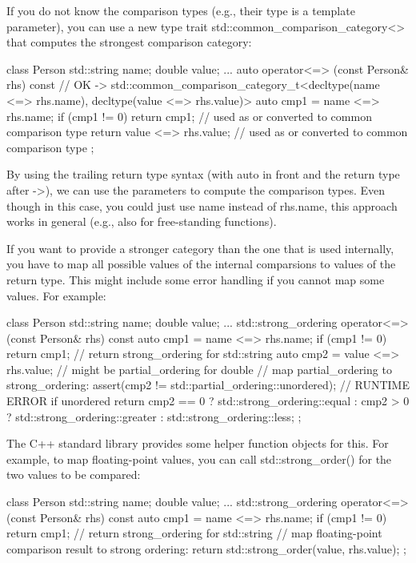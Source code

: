 If you do not know the comparison types (e.g., their type is a template parameter), you can use a new type trait std::common\_comparison\_category<> that computes the strongest comparison category:

\begin{cpp}
class Person {
	std::string name;
	double value;
	...
	auto operator<=> (const Person& rhs) const // OK
	-> std::common_comparison_category_t<decltype(name <=> rhs.name),
										 decltype(value <=> rhs.value)> {
		auto cmp1 = name <=> rhs.name;
		if (cmp1 != 0) return cmp1; // used as or converted to common comparison type
		return value <=> rhs.value; // used as or converted to common comparison type
	}
};
\end{cpp}

By using the trailing return type syntax (with auto in front and the return type after ->), we can use the parameters to compute the comparison types. Even though in this case, you could just use name instead of rhs.name, this approach works in general (e.g., also for free-standing functions).

If you want to provide a stronger category than the one that is used internally, you have to map all possible values of the internal comparsions to values of the return type. This might include some error handling if you cannot map some values. For example:

\begin{cpp}
class Person {
	std::string name;
	double value;
	...
	std::strong_ordering operator<=> (const Person& rhs) const {
		auto cmp1 = name <=> rhs.name;
		if (cmp1 != 0) return cmp1; // return strong_ordering for std::string
		auto cmp2 = value <=> rhs.value; // might be partial_ordering for double
		// map partial_ordering to strong_ordering:
		assert(cmp2 != std::partial_ordering::unordered); // RUNTIME ERROR if unordered
		return cmp2 == 0 ? std::strong_ordering::equal
		                 : cmp2 > 0 ? std::strong_ordering::greater
		                            : std::strong_ordering::less;
	}
};
\end{cpp}

The C++ standard library provides some helper function objects for this. For example, to map floating-point values, you can call std::strong\_order() for the two values to be compared:

\begin{cpp}
class Person {
	std::string name;
	double value;
	...
	std::strong_ordering operator<=> (const Person& rhs) const {
		auto cmp1 = name <=> rhs.name;
		if (cmp1 != 0) return cmp1; // return strong_ordering for std::string
		// map floating-point comparison result to strong ordering:
		return std::strong_order(value, rhs.value);
	}
};
\end{cpp}

